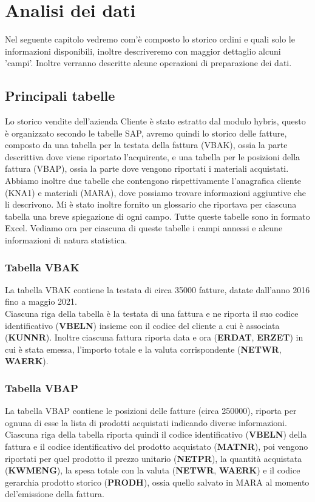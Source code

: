 
\hypertarget{(chap:capitolo2)}{}
\chapter{Analisi dei dati}
Nel seguente capitolo vedremo com'è composto lo storico ordini e quali solo le informazioni disponibili, inoltre descriveremo con maggior dettaglio alcuni 'campi'. Inoltre verranno descritte alcune operazioni di preparazione dei dati.
\section{Principali tabelle}
Lo storico vendite dell'azienda Cliente è stato estratto dal modulo hybris, questo è organizzato secondo le tabelle SAP, avremo quindi lo storico delle fatture, composto da una tabella per la testata della fattura (VBAK), ossia la parte descrittiva dove viene riportato l'acquirente, e una tabella per le posizioni della fattura (VBAP), ossia la parte dove vengono riportati i materiali acquistati. 
Abbiamo inoltre due tabelle che contengono rispettivamente l'anagrafica cliente (KNA1) e materiali (MARA), dove possiamo trovare informazioni aggiuntive che li descrivono. 
Mi è stato inoltre fornito un glossario che riportava per ciascuna tabella una breve spiegazione di ogni campo. 
Tutte queste tabelle sono in formato Excel.
Vediamo ora per ciascuna di queste tabelle i campi annessi e alcune informazioni di natura statistica.

\subsection{Tabella VBAK}
La tabella VBAK contiene la testata di circa 35000 fatture, datate dall'anno 2016 fino a maggio 2021.\\
Ciascuna riga della tabella è la testata di una fattura e ne riporta il suo codice identificativo (\textbf{VBELN}) insieme con il codice del cliente a cui è associata (\textbf{KUNNR}). Inoltre ciascuna fattura riporta data e ora (\textbf{ERDAT}, \textbf{ERZET}) in cui è stata emessa, l'importo totale e la valuta corrispondente (\textbf{NETWR}, \textbf{WAERK}).

\subsection{Tabella VBAP}
La tabella VBAP contiene le posizioni delle fatture (circa 250000), riporta per ognuna di esse la lista di prodotti acquistati indicando diverse informazioni.
Ciascuna riga della tabella riporta quindi il codice identificativo (\textbf{VBELN}) della fattura e il codice identificativo del prodotto acquistato (\textbf{MATNR}), poi vengono riportati per quel prodotto il prezzo unitario (\textbf{NETPR}), la quantità acquistata (\textbf{KWMENG}), la spesa totale con la valuta (\textbf{NETWR}, \textbf{WAERK}) e il codice gerarchia prodotto storico (\textbf{PRODH}), ossia quello salvato in MARA al momento del'emissione della fattura.

